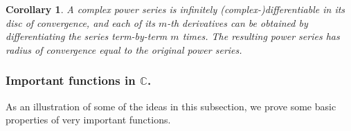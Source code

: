 \documentclass[a4paper,reqno]{amsart}
\numberwithin{equation}{section}
\newtheorem{corollary}[definition]{Corollary}
\def\C{\mathbb{C}}
\begin{document}
\begin{corollary}
A complex power series is infinitely (complex-)differentiable in its disc of convergence, and each of its $m$-th derivatives can be obtained by differentiating the series term-by-term $m$ times. The resulting power series has radius of convergence equal to the original power series.
\end{corollary}

\medskip

\subsubsection{Important functions in $\C$.}

As an illustration of some of the ideas in this subsection, we prove some basic properties of very important functions.

\medskip
\end{document}
